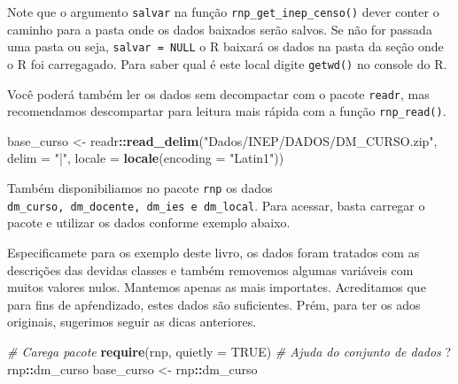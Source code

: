 \documentclass[11pt,]{style/krantz}
\makeatletter
\newenvironment{Shaded}{\begin{snugshade}}{\end{snugshade}}
\newcommand{\CommentTok}[1]{\textcolor[rgb]{0.56,0.35,0.01}{\textit{#1}}}
\newcommand{\DataTypeTok}[1]{\textcolor[rgb]{0.13,0.29,0.53}{#1}}
\newcommand{\KeywordTok}[1]{\textcolor[rgb]{0.13,0.29,0.53}{\textbf{#1}}}
\newcommand{\NormalTok}[1]{#1}
\newcommand{\OperatorTok}[1]{\textcolor[rgb]{0.81,0.36,0.00}{\textbf{#1}}}
\newcommand{\OtherTok}[1]{\textcolor[rgb]{0.56,0.35,0.01}{#1}}
\newcommand{\StringTok}[1]{\textcolor[rgb]{0.31,0.60,0.02}{#1}}
\renewenvironment{quote}{\begin{VF}}{\end{VF}}
\newenvironment{kframe}{%
\medskip{}
\setlength{\fboxsep}{.8em}
 \def\at@end@of@kframe{}%
 \ifinner\ifhmode%
  \def\at@end@of@kframe{\end{minipage}}%
  \begin{minipage}{\columnwidth}%
 \fi\fi%
 \def\FrameCommand##1{\hskip\@totalleftmargin \hskip-\fboxsep
 \colorbox{shadecolor}{##1}\hskip-\fboxsep
     \hskip-\linewidth \hskip-\@totalleftmargin \hskip\columnwidth}%
 \MakeFramed {\advance\hsize-\width
   \@totalleftmargin\z@ \linewidth\hsize
   \@setminipage}}%
 {\par\unskip\endMakeFramed%
 \at@end@of@kframe}
\renewenvironment{Shaded}{\begin{kframe}}{\end{kframe}}
\theoremstyle{definition}
\theoremstyle{definition}
\theoremstyle{definition}
\theoremstyle{remark}
\makeatother
\begin{document}
\begin{quote}
Note que o argumento \texttt{salvar} na função \texttt{rnp\_get\_inep\_censo()} dever conter o caminho para a pasta onde os dados baixados serão salvos.
Se não for passada uma pasta ou seja, \texttt{salvar\ =\ NULL} o R baixará os dados na pasta da seção onde o R foi carregagado. Para saber qual é este local digite \texttt{getwd()} no console do R.
\end{quote}

Você poderá também ler os dados sem decompactar com o pacote \texttt{readr}, mas recomendamos descompartar para leitura mais rápida com a função \texttt{rnp\_read()}.

\begin{Shaded}
\begin{Highlighting}[]
\NormalTok{base_curso <-}\StringTok{ }\NormalTok{readr}\OperatorTok{::}\KeywordTok{read_delim}\NormalTok{(}\StringTok{"Dados/INEP/DADOS/DM_CURSO.zip"}\NormalTok{, }
                        \DataTypeTok{delim =} \StringTok{"|"}\NormalTok{, }\DataTypeTok{locale =} \KeywordTok{locale}\NormalTok{(}\DataTypeTok{encoding =} \StringTok{"Latin1"}\NormalTok{))}
\end{Highlighting}
\end{Shaded}

Também disponibiliamos no pacote \texttt{rnp} os dados \texttt{dm\_curso,\ dm\_docente,\ dm\_ies\ e\ dm\_local}. Para acessar, basta carregar o pacote e utilizar os dados conforme exemplo abaixo.

\begin{quote}
Especificamete para os exemplo deste livro, os dados foram tratados com as descrições das devidas classes e também removemos algumas variáveis com muitos valores nulos. Mantemos apenas as mais importates. Acreditamos que para fins de apŕendizado, estes dados são suficientes. Prém, para ter os ados originais, sugerimos seguir as dicas anteriores.
\end{quote}

\begin{Shaded}
\begin{Highlighting}[]
\CommentTok{# Carega pacote}
\KeywordTok{require}\NormalTok{(rnp, }\DataTypeTok{quietly =} \OtherTok{TRUE}\NormalTok{)}
\CommentTok{# Ajuda do conjunto de dados}
\NormalTok{?rnp}\OperatorTok{::}\NormalTok{dm_curso}
\NormalTok{base_curso <-}\StringTok{ }\NormalTok{rnp}\OperatorTok{::}\NormalTok{dm_curso}
\end{Highlighting}
\end{Shaded}
\end{document}
